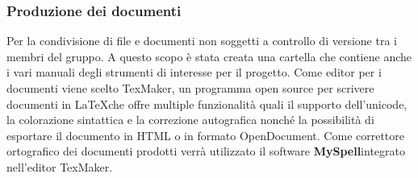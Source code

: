 \documentclass[a4paper,11pt]{article}
\begin{document}
	\subsubsection{Produzione dei documenti}
	
	Per la condivisione di file e documenti non soggetti a controllo di versione tra i membri del gruppo. A questo scopo è stata creata una cartella che contiene anche i vari  manuali degli strumenti di interesse per il progetto.
	Come editor per i documenti viene scelto TexMaker\addglos, un programma open source per scrivere documenti in \LaTeX   che offre multiple funzionalità quali il supporto dell'unicode, la colorazione sintattica e la correzione autografica nonché la possibilità di esportare il documento in HTML o in formato OpenDocument\addglos.
	Come correttore ortografico dei documenti prodotti verrà utilizzato il software \textbf{MySpell}\addglos integrato nell'editor TexMaker.
	\newpage
	
		
	
\end{document}
